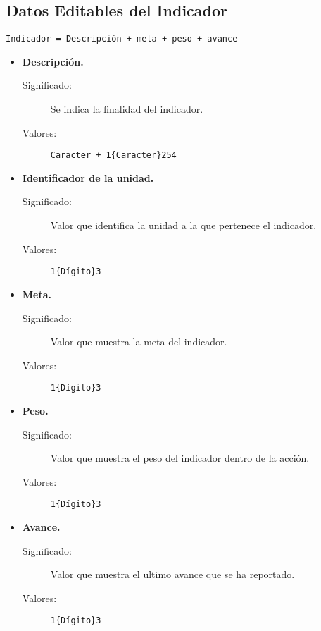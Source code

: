 \subsection{Datos Editables del Indicador}
\label{dd:DatosEditablesIndicador}
\begin{lstlisting}
Indicador = Descripción + meta + peso + avance
\end{lstlisting}
  \begin{itemize}
    \item \textbf{Descripción.}
      \begin{description}
        \item [Significado:] Se indica la finalidad del indicador.
        \item [Valores:]{\begin{lstlisting}
Caracter + 1{Caracter}254\end{lstlisting}}\end{description}

    \item \textbf{Identificador de la unidad.}
      \begin{description}
        \item [Significado:] Valor que identifica la unidad a la que pertenece el indicador.
        \item [Valores:]{\begin{lstlisting}
1{Dígito}3\end{lstlisting}}\end{description}

    \item \textbf{Meta.}
      \begin{description}
        \item [Significado:] Valor que muestra la meta del indicador.
        \item [Valores:]{\begin{lstlisting}
1{Dígito}3\end{lstlisting}}\end{description}

    \item \textbf{Peso.}
      \begin{description}
        \item [Significado:] Valor que muestra el peso del indicador dentro de la acción.
        \item [Valores:]{\begin{lstlisting}
1{Dígito}3\end{lstlisting}}\end{description}

    \item \textbf{Avance.}
      \begin{description}
        \item [Significado:] Valor que muestra el ultimo avance que se ha reportado.
        \item [Valores:]{\begin{lstlisting}
1{Dígito}3\end{lstlisting}}\end{description}
\end{itemize}

